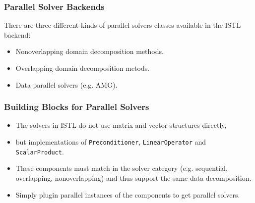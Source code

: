 \begin{frame}
  \frametitle<presentation>{Parallel Solver Backends}
  
  There are three different kinds of parallel solvers classes
  available in the ISTL backend:
  \begin{itemize}
  \item Nonoverlapping domain decomposition
    methods.
  \item Overlapping domain decomposition metods.
  \item Data parallel solvers (e.g. AMG).
  \end{itemize}
\end{frame}

\begin{frame}
  \frametitle{Building Blocks for Parallel Solvers}

  \begin{itemize}
  \item The solvers in ISTL do not use matrix and vector structures
    directly,
  \item but implementations of \lstinline!Preconditioner!,
    \lstinline!LinearOperator! and \lstinline!ScalarProduct!.
  \item These components must match in the solver category
    (e.g. sequential, overlapping, nonoverlapping) and thus support
    the same data decomposition.
  \item Simply plugin parallel instances of the components to get
    parallel solvers.
  \end{itemize}
\end{frame}


